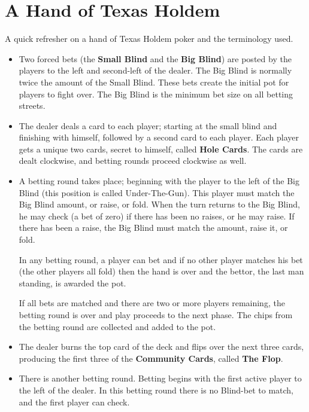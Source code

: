 \chapter{A Hand of Texas Holdem}


A quick refresher on a hand of Texas Holdem poker and the terminology
used.

\begin{itemize}

\item Two forced bets (the \textbf{Small Blind} and the \textbf{Big
  Blind}) are posted by   the players to the left and second-left of
  the dealer. The Big Blind   is normally twice the amount of the
  Small Blind. These bets create the initial pot for players to
  fight over. The Big Blind is the minimum bet size on all betting streets.
  
\item The dealer deals a card to each player; starting at the small
  blind and finishing with himself, followed by a second card to each
  player. Each player gets a unique two cards, secret to himself,
  called \textbf{Hole Cards}. The cards are dealt clockwise, and
  betting rounds proceed clockwise as well.
  
\item A betting round takes place; beginning with the player to the
  left of the Big Blind (this position is called Under-The-Gun). This
  player must match the Big Blind amount, or raise, or fold. When the
  turn returns to the Big Blind, he may check (a bet of zero) if there
  has been no raises, or he may raise. If there has been a raise, the
  Big Blind must match the amount, raise it, or fold.

  In any betting round, a player can bet and if no other player
  matches his bet (the other players all fold) then the hand is over
  and the bettor, the last man standing, is awarded the pot.

  If all bets are matched and there are two or more players remaining,
  the betting round is over and play proceeds to the next phase.
  The chips from the betting round are collected and added to the pot.

\item The dealer burns the top card of the deck and flips over the
  next three cards, producing the first three of the \textbf{Community
  Cards}, called \textbf{The Flop}.

\item There is another betting round. Betting begins with the first
  active player to the left of the dealer. In this betting round there
  is no Blind-bet to match, and the first player can check.


\end{itemize}
